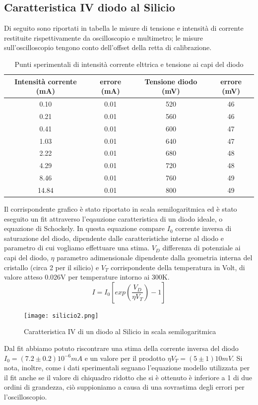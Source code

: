 \documentclass{article}
\begin{document}
\subsection{Caratteristica IV diodo al Silicio}
Di seguito sono riportati in tabella le misure di tensione e intensità di corrente restituite rispettivamente da oscilloscopio e multimetro; le misure sull’oscilloscopio tengono conto dell’offset della retta di calibrazione.
\begin{table}[h!]
    \centering
    \begin{tabular}{|||c|c||c|c||}
    \hline
    Intensità corrente (mA) & errore (mA) & Tensione diodo (mV) & errore (mV) \\
    \hline\hline
    0.10 & 0.01 & 520 & 46 \\
    0.21 & 0.01 & 560 & 46 \\
    0.41 & 0.01 & 600 & 47 \\
    1.03 & 0.01 & 640 & 47 \\
    2.22 & 0.01 & 680 & 48 \\
    4.29 & 0.01 & 720 & 48 \\
    8.46 & 0.01 & 760 & 49 \\
    14.84 & 0.01 & 800 & 49 \\
    \hline
    \end{tabular}
    \caption{Punti sperimentali di intensità corrente elttrica e tensione ai capi del diodo}
    \label{tab:my_label}
\end{table}
Il corrispondente grafico è stato riportato in scala semilogaritmica ed è stato eseguito un fit attraverso l’eqauzione caratteristica di un diodo ideale, o equazione di Schockely. In questa equazione compare \(I_0\) corrente inversa di saturazione del diodo, dipendente dalle caratteristiche interne al diodo e parametro di cui vogliamo effettuare una stima. \(V_D\) differenza di potenziale ai capi del diodo, \(\eta\) parametro adimensionale dipendente dalla geometria interna del cristallo (circa 2 per il silicio) e \(V_T\) corrispondente della temperatura in Volt, di valore atteso 0.026V per temperature intorno ai 300K.
\begin{equation}
I = I_0 [exp({\frac{V_D}{\eta V_T}})-1]
\end{equation}
\begin{figure}
    \centering
    \texttt{[image: silicio2.png]}
    \caption{Caratteristica IV di un diodo al Silicio in scala semilogaritmica}
    \label{fig:my_label}
\end{figure}
Dal fit abbiamo potuto riscontrare una stima della corrente inversa del diodo \(I_0 = (7.2\pm0.2)10^{-6}mA\) e un valore per il prodotto \(\eta V_T=(5\pm1)10mV\). Si nota, inoltre, come i dati sperimentali seguano l’equazione modello utilizzata per il fit anche se il valore di chiquadro ridotto che si è ottenuto è inferiore a 1 di due ordini di grandezza, ciò suppioniamo a causa di una sovrastima degli errori per l’oscilloscopio.
\end{document}
